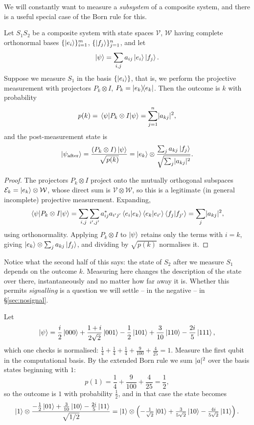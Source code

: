 \documentclass[a4paper]{scrartcl}
\newcommand{\Vs}{\mathcal{V}}
\newcommand{\Ws}{\mathcal{W}}
\newcommand{\Es}{\mathcal{E}}
\begin{document}
We will constantly want to measure a \emph{subsystem} of a composite system, and there is a useful special case of the Born rule for this.

\begin{proposition}
	Let $S_1S_2$ be a composite system with state spaces $\Vs$, $\Ws$ having complete orthonormal bases $\{\ket{e_i}\}_{i=1}^m$, $\{\ket{f_j}\}_{j=1}^n$, and let
	$$\ket{\psi} = \sum_{i,j} a_{ij}\ket{e_i}\ket{f_j}.$$
	Suppose we measure $S_1$ in the basis $\{\ket{e_i}\}$, that is, we perform the projective measurement with projectors $P_k \otimes I$, $P_k = \op{e_k}{e_k}$. Then the outcome is $k$ with probability
	$$p(k) = \mel{\psi}{P_k\otimes I}{\psi} = \sum_{j=1}^n \lvert a_{kj}\rvert^2,$$
	and the post-measurement state is
	$$\ket{\psi_{\text{after}}} = \frac{(P_k\otimes I)\ket{\psi}}{\sqrt{p(k)}} = \ket{e_k}\otimes\frac{\sum_j a_{kj}\ket{f_j}}{\sqrt{\sum_j \lvert a_{kj}\rvert^2}}.$$
\end{proposition}

\begin{proof}
	The projectors $P_k \otimes I$ project onto the mutually orthogonal subspaces $\Es_k = \ket{e_k}\otimes\Ws$, whose direct sum is $\Vs\otimes\Ws$, so this is a legitimate (in general incomplete) projective measurement. Expanding,
	$$\mel{\psi}{P_k \otimes I}{\psi} = \sum_{i,j}\sum_{i',j'}a_{ij}^*a_{i'j'}\ip{e_i}{e_k}\ip{e_k}{e_{i'}}\ip{f_j}{f_{j'}} = \sum_j \abs{a_{kj}}^2,$$
	using orthonormality. Applying $P_k\otimes I$ to $\ket{\psi}$ retains only the terms with $i = k$, giving $\ket{e_k}\otimes\sum_j a_{kj}\ket{f_j}$, and dividing by $\sqrt{p(k)}$ normalises it.
\end{proof}

Notice what the second half of this says: the state of $S_2$ after we measure $S_1$ depends on the outcome $k$. Measuring here changes the description of the state over there, instantaneously and no matter how far away it is. Whether this permits \emph{signalling} is a question we will settle -- in the negative -- in \S\ref{sec:nosignal}.

\begin{example}
	Let
	$$\ket{\psi} = \frac{i}{2}\ket{000} + \frac{1+i}{2\sqrt2}\ket{001} - \frac{1}{2}\ket{101} + \frac{3}{10}\ket{110} - \frac{2i}{5}\ket{111},$$
	which one checks is normalised: $\tfrac14 + \tfrac14 + \tfrac14 + \tfrac9{100} + \tfrac4{25} = 1$. Measure the first qubit in the computational basis. By the extended Born rule we sum $\lvert a\rvert^2$ over the basis states beginning with $1$:
	$$p(1) = \frac14 + \frac{9}{100} + \frac{4}{25} = \frac{1}{2},$$
	so the outcome is $1$ with probability $\tfrac12$, and in that case the state becomes
	$$\ket{1}\otimes\frac{-\tfrac12\ket{01} + \tfrac3{10}\ket{10} - \tfrac{2i}5\ket{11}}{\sqrt{1/2}} = \ket{1}\otimes\left(-\tfrac{1}{\sqrt2}\ket{01} + \tfrac{3}{5\sqrt2}\ket{10} - \tfrac{4i}{5\sqrt2}\ket{11}\right).$$
\end{example}
\end{document}
